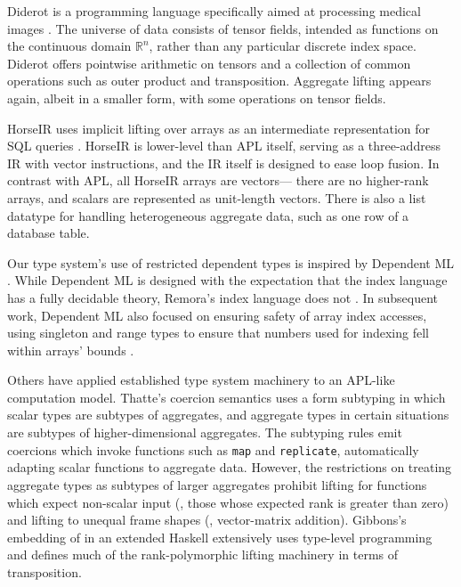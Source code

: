 Diderot is a programming language
specifically aimed at processing medical images \cite{Diderot}.
The universe of data consists of tensor fields,
intended as functions on the continuous domain $\mathbb{R}^n$,
rather than any particular discrete index space.
Diderot offers pointwise arithmetic on tensors
and a collection of common operations such as outer product and transposition.
Aggregate lifting appears again,
albeit in a smaller form,
with some operations on tensor fields.

HorseIR uses implicit lifting over arrays
as an intermediate representation for SQL queries \cite{HorseIR}.
HorseIR is lower-level than APL itself,
serving as a three-address IR with vector instructions,
and the IR itself is designed to ease loop fusion.
In contrast with APL, all HorseIR arrays are vectors---%
there are no higher-rank arrays, and scalars are represented as unit-length vectors.
There is also a list datatype for handling heterogeneous aggregate data,
such as one row of a database table.


Our type system's use of restricted dependent types
is inspired by Dependent ML \cite{DependentML}.
While Dependent ML is designed with the expectation
that the index language has a fully decidable theory,
Remora's index language does not \cite{Durnev}.
In subsequent work,
Dependent ML also focused on ensuring safety of array index accesses,
using singleton and range types to ensure
that numbers used for indexing fell within arrays' bounds \cite{DMLBounds}.

Others have applied established type system machinery
to an APL-like computation model.
Thatte's coercion semantics \cite{ThatteCoercion}
uses a form subtyping in which
scalar types are subtypes of aggregates,
and aggregate types in certain situations are subtypes of higher-dimensional aggregates.
The subtyping rules emit coercions which invoke functions such as {\tt map} and {\tt replicate},
automatically adapting scalar functions to aggregate data.
However, the restrictions on treating aggregate types as subtypes of larger aggregates
prohibit lifting for functions which expect non-scalar input
(\ie, those whose expected rank is greater than zero)
and lifting to unequal frame shapes
(\eg, vector-matrix addition).
Gibbons's embedding of in an extended Haskell \cite{APLicative}
extensively uses type-level programming
and defines much of the rank-polymorphic lifting machinery
in terms of transposition.

